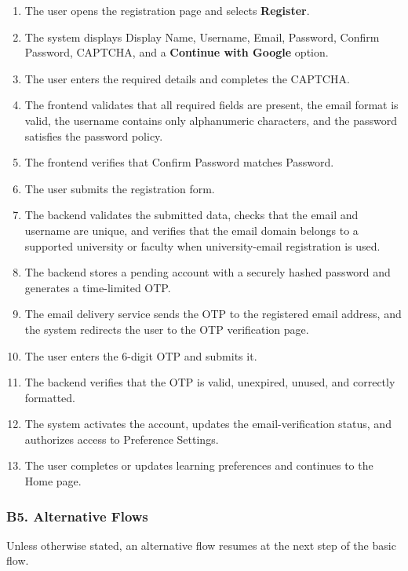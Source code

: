 \documentclass[12pt]{article}
\begin{document}
\begin{enumerate}
\item The user opens the registration page and selects \textbf{Register}.
\item The system displays Display Name, Username, Email, Password, Confirm Password, CAPTCHA, and a \textbf{Continue with Google} option.
\item The user enters the required details and completes the CAPTCHA.
\item The frontend validates that all required fields are present, the email format is valid, the username contains only alphanumeric characters, and the password satisfies the password policy.
\item The frontend verifies that Confirm Password matches Password.
\item The user submits the registration form.
\item The backend validates the submitted data, checks that the email and username are unique, and verifies that the email domain belongs to a supported university or faculty when university-email registration is used.
\item The backend stores a pending account with a securely hashed password and generates a time-limited OTP.
\item The email delivery service sends the OTP to the registered email address, and the system redirects the user to the OTP verification page.
\item The user enters the 6-digit OTP and submits it.
\item The backend verifies that the OTP is valid, unexpired, unused, and correctly formatted.
\item The system activates the account, updates the email-verification status, and authorizes access to Preference Settings.
\item The user completes or updates learning preferences and continues to the Home page.
\end{enumerate}
\par\medskip

\hypertarget{sec:b5-alternative-flows}{}
\subsubsection*{B5. Alternative Flows}
\par\medskip

Unless otherwise stated, an alternative flow resumes at the next step of the basic flow.
\par\medskip
\end{document}
